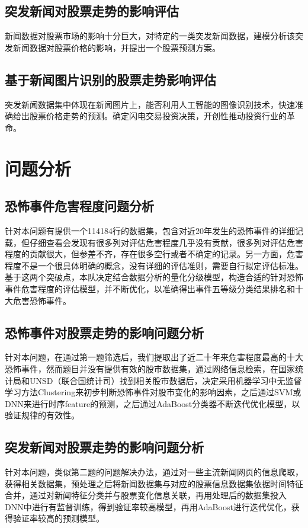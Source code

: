 \documentclass{cumcmthesis}
\begin{document}
\subsection{突发新闻对股票走势的影响评估}
 新闻数据对股票市场的影响十分巨大，对特定的一类突发新闻数据，建模分析该突发新闻数据对股票价格的影响，并提出一个股票预测方案。 
 
\subsection{基于新闻图片识别的股票走势影响评估}
 突发新闻数据集中体现在新闻图片上，能否利用人工智能的图像识别技术，快速准确给出股票价格走势的预测。确定闪电交易投资决策，开创性推动投资行业的革命。 
 
\newpage
\section{问题分析}
\subsection{恐怖事件危害程度问题分析}
针对本问题有提供一个114184行的数据集，包含对近20年发生的恐怖事件的详细记载，但仔细查看会发现有很多列对评估危害程度几乎没有贡献，很多列对评估危害程度的贡献很大，但参差不齐，存在很多空行或者不确定的记录。另一方面，危害程度不是一个很具体明确的概念，没有详细的评估准则，需要自行拟定评估标准。基于这两个突破点，本队决定结合数据分析的量化分级模型，构造合适的针对恐怖事件危害程度的评估模型，并不断优化，以准确得出事件五等级分类结果排名和十大危害恐怖事件。

\subsection{恐怖事件对股票走势的影响问题分析}
针对本问题，在通过第一题筛选后，我们提取出了近二十年来危害程度最高的十大恐怖事件，然而题目并没有提供有效的股市数据集，通过网络信息检索，在国家统计局和UNSD（联合国统计司）找到相关股市数据后，决定采用机器学习中无监督学习方法Clustering来初步判断恐怖事件对股市变化的影响因素，之后通过SVM或DNN来进行时序feature的预测，之后通过AdaBoost分类器不断迭代优化模型，以验证规律的有效性。

\subsection{突发新闻对股票走势的影响问题分析}
针对本问题，类似第二题的问题解决办法，通过对一些主流新闻网页的信息爬取，获得相关数据集，预处理之后将新闻数据集与对应的股票信息数据集依据时间特征合并，通过对新闻特征分类并与股票变化信息关联，再用处理后的数据集投入DNN中进行有监督训练，得到验证率较高模型，再用AdaBoost进行迭代优化，获得验证率较高的预测模型。
\end{document}
